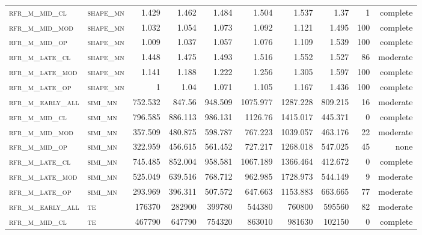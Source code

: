 \begin{landscape}
\begin{center}
\begin{footnotesize}
\begin{longtable}{llrrrrr|rrr}
\textsc{rfr\_m\_mid\_cl   } & \textsc{shape\_mn }   & 1.429   & 1.462   & 1.484   & 1.504    & 1.537    & 1.37    & 1   & complete \\
\textsc{rfr\_m\_mid\_mod  } & \textsc{shape\_mn }   & 1.032   & 1.054   & 1.073   & 1.092    & 1.121    & 1.495   & 100 & complete \\
\textsc{rfr\_m\_mid\_op   } & \textsc{shape\_mn }   & 1.009   & 1.037   & 1.057   & 1.076    & 1.109    & 1.539   & 100 & complete \\
\textsc{rfr\_m\_late\_cl  } & \textsc{shape\_mn }   & 1.448   & 1.475   & 1.493   & 1.516    & 1.552    & 1.527   & 86  & moderate \\
\textsc{rfr\_m\_late\_mod } & \textsc{shape\_mn }   & 1.141   & 1.188   & 1.222   & 1.256    & 1.305    & 1.597   & 100 & complete \\
\textsc{rfr\_m\_late\_op  } & \textsc{shape\_mn }   & 1       & 1.04    & 1.071   & 1.105    & 1.167    & 1.436   & 100 & complete \\
\textsc{rfr\_m\_early\_all} & \textsc{simi\_mn  }   & 752.532 & 847.56  & 948.509 & 1075.977 & 1287.228 & 809.215 & 16  & moderate \\
\textsc{rfr\_m\_mid\_cl   } & \textsc{simi\_mn  }   & 796.585 & 886.113 & 986.131 & 1126.76  & 1415.017 & 445.371 & 0   & complete \\
\textsc{rfr\_m\_mid\_mod  } & \textsc{simi\_mn  }   & 357.509 & 480.875 & 598.787 & 767.223  & 1039.057 & 463.176 & 22  & moderate \\
\textsc{rfr\_m\_mid\_op   } & \textsc{simi\_mn  }   & 322.959 & 456.615 & 561.452 & 727.217  & 1268.018 & 547.025 & 45  & none     \\
\textsc{rfr\_m\_late\_cl  } & \textsc{simi\_mn  }   & 745.485 & 852.004 & 958.581 & 1067.189 & 1366.464 & 412.672 & 0   & complete \\
\textsc{rfr\_m\_late\_mod } & \textsc{simi\_mn  }   & 525.049 & 639.516 & 768.712 & 962.985  & 1728.973 & 544.149 & 9   & moderate \\
\textsc{rfr\_m\_late\_op  } & \textsc{simi\_mn  }   & 293.969 & 396.311 & 507.572 & 647.663  & 1153.883 & 663.665 & 77  & moderate \\
\textsc{rfr\_m\_early\_all} & \textsc{te  	    }   & 176370  & 282900  & 399780  & 544380   & 760800   & 595560  & 82  & moderate \\
\textsc{rfr\_m\_mid\_cl   } & \textsc{te        }   & 467790  & 647790  & 754320  & 863010   & 981630   & 102150  & 0   & complete \\

\end{longtable}
\end{footnotesize}
\end{center}
\end{landscape}
